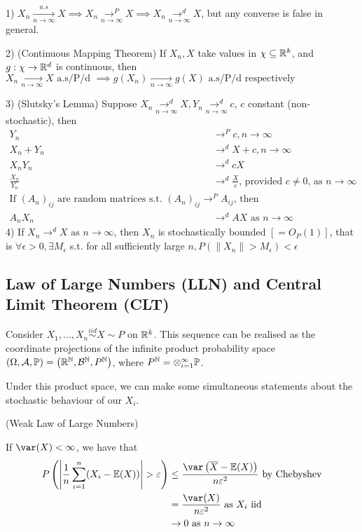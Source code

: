 \documentclass[a4paper]{article}
\begin{document}
\begin{prop}
	1) $X_n \underset{n\to \infty}{\overset{a.s}{\to}} X \implies X_n \underset{n\to \infty}{\to^{P}} X \implies X_n \underset{n\to \infty}{\to^{d}} X$, but any converse is false in general.

	2) (Continuous Mapping Theorem) If $X_n, X$ take values in $\chi \subseteq \mathbb{R}^{k} $, and $g:\chi \to \mathbb{R}^{d}$ is continuous, then $X_n \underset{n\to \infty}{\to} X \text{ a.s/P/d } \implies g(X_n) \underset{n \to  \infty}{\to} g(X) \text{ a.s/P/d respectively} $

	3) (Slutsky's Lemma) Suppose $X_n \underset{n\to \infty}{\to^{d}} X, Y_n \underset{n\to \infty}{\to^{d}} c$,  $c$ constant (non-stochastic), then
	 \begin{align*}
		 Y_n &\to ^{P} c, n\to \infty  \\
		 X_n + Y_n &\to^{d} X + c, n\to \infty  \\
		 X_nY_n &\to^{d} cX \\
		 \frac{X_n}{Y_n} &\to ^{d} \frac{X}{c} \text{, provided $c \neq 0$, as $n\to \infty$ } \\
		 \text{If $(A_n)_{ij}$ are random matrices s.t. $(A_n)_{ij} \to^{P} A_{ij}$, then} \\
		 A_n X_n &\to^{d} AX \text{ as } n\to \infty
	 \end{align*}
	 4) If $X_n \to^{d} X \text{ as } n \to \infty$, then $X_n$ is stochastically bounded $\left[ = O_P(1) \right]$, that is $\forall \epsilon > 0, \exists M_{\epsilon}$ s.t. for all sufficiently large  $n, P\left( \|X_n\| > M_{\epsilon} \right) < \epsilon$ 

\end{prop}

\subsection{Law of Large Numbers (LLN) and Central Limit Theorem (CLT)}

Consider $X_1,\ldots,X_n \stackrel{iid}{\sim} X \sim P$ on $\mathbb{R}^{k}$. This sequence can be realised as the coordinate projections of the infinite product probability space $\left( \Omega, \mathcal{A}, \mathbb{P} \right) = \left( \mathbb{R}^{\mathbb{N}}, \mathcal{B}^{\mathbb{N}}, P^{\mathbb{N}} \right)$, where $P^{\mathbb{N}} = \otimes_{i=1}^{\infty} \mathbb{P}$.

Under this product space, we can make some simultaneous statements about the stochastic behaviour of our $X_i$.

\begin{thm}
	(Weak Law of Large Numbers)

	If $\var(X) < \infty$, we have that 
	\begin{align*}
		P\left( \left| \frac{1}{n}\sum_{i=1}^{n} (X_{i} - \E(X)) \right| > \epsilon \right) &\le \frac{\var\left( \overline{X} - \E(X) \right)}{n\epsilon^2} \text{ by Chebyshev} \\ 
		&= \frac{\var(X)}{n\epsilon^2} \text{ as $X_i$ iid}\\
		&\to 0 \text{ as  } n \to \infty
	\end{align*}
\end{thm}	
\end{document}
